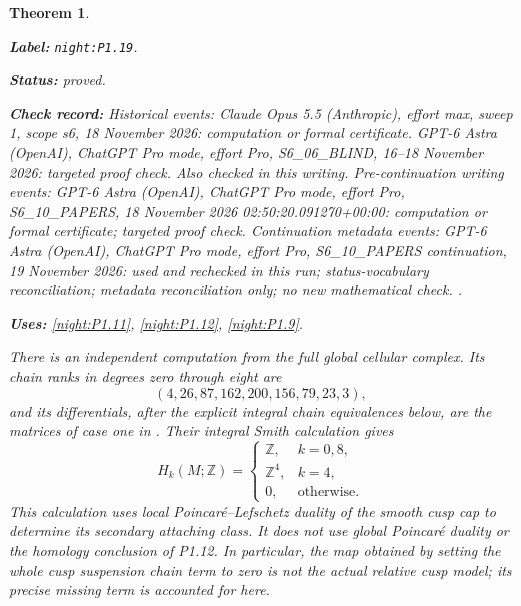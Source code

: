 \documentclass[11pt,a4paper]{article}
\newtheorem{theorem}{Theorem}[section]
\theoremstyle{definition}
\newcommand{\StatementRecord}[4]{\par\smallskip\begingroup\upshape\raggedright\noindent\textbf{Label:} \nolinkurl{#1}.\par\noindent\textbf{Status:} #2.\par\noindent\textbf{Check record:} #3.\par\noindent\textbf{Uses:} #4.\par\endgroup\smallskip}
\begin{document}
\begin{theorem}\label{night:P1.19}
\StatementRecord{night:P1.19}{proved}{Historical events: Claude Opus 5.5 (Anthropic), effort max, sweep 1, scope s6, 18 November 2026: computation or formal certificate. GPT-6 Astra (OpenAI), ChatGPT Pro mode, effort Pro, S6\_06\_BLIND, 16--18 November 2026: targeted proof check. Also checked in this writing. Pre-continuation writing events: GPT-6 Astra (OpenAI), ChatGPT Pro mode, effort Pro, S6\_10\_PAPERS, 18 November 2026 02:50:20.091270+00:00: computation or formal certificate; targeted proof check. Continuation metadata events: GPT-6 Astra (OpenAI), ChatGPT Pro mode, effort Pro, S6\_10\_PAPERS continuation, 19 November 2026: used and rechecked in this run; status-vocabulary reconciliation; metadata reconciliation only; no new mathematical check. }{\cref{night:P1.11}, \cref{night:P1.12}, \cref{night:P1.9}}
There is an independent computation from the full global cellular
complex.  Its chain ranks in degrees zero through eight are
\[
 (4,26,87,162,200,156,79,23,3),
\]
and its differentials, after the explicit integral chain equivalences
below, are the matrices of case one in
.
Their integral Smith calculation gives
\[
 H_k(M;\mathbb Z)=
 \begin{cases}
 \mathbb Z,&k=0,8,\\
 \mathbb Z^4,&k=4,\\
 0,&\text{otherwise}.
 \end{cases}
\]
This calculation uses local Poincar\'e--Lefschetz duality of the
smooth cusp cap to determine its secondary attaching class.  It does
not use global Poincar\'e duality or the homology conclusion of P1.12.
In particular, the map obtained by setting the whole cusp suspension
chain term to zero is not the actual relative cusp model; its precise
missing term is accounted for here.
\end{theorem}
\end{document}
